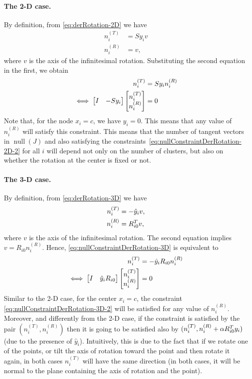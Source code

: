 \documentclass[12pt]{article}
\DeclareMathOperator{\nullspace}{null}
\newcommand{\niT}{n_i^{(T)}}
\newcommand{\niR}{n_i^{(R)}}
\begin{document}
\paragraph{The 2-D case.} By definition, from \eqref{eq:derRotation-2D} we have
\begin{align}
  \label{eq:nullConstraintDerRotation-2D-T}
  \niT&=Sy_iv\\
  \label{eq:nullConstraintDerRotation-2D-R}
  \niR&=v,
\end{align}
where $v$ is the axis of the infinitesimal rotation. Substituting the second equation in the first, we obtain
\begin{align}
    \niT&=Sy_i\niR\\
    \iff \bmat{I & -Sy_i}\bmat{\niT\\\niR}&=0 
    \label{eq:nullConstraintDerRotation-2D-2}
\end{align}
Note that, for the node $x_i=c$, we have $y_i=0$. This means that any value of $\niR$ will satisfy this constraint. This means that the number of tangent vectors in $\nullspace(J)$ and also satisfying the constraints~\eqref{eq:nullConstraintDerRotation-2D-2} for all $i$ will depend not only on the number of clusters, but also on whether the rotation at the center is fixed or not.
\paragraph{The 3-D case.} By definition, from \eqref{eq:derRotation-3D} we have
\begin{align}
  \label{eq:nullConstraintDerRotation-3D-T}
    \niT&=-\hat{y}_i v,\\
  \label{eq:nullConstraintDerRotation-3D-R}
    \niR&=R_{i0}\transpose v,
\end{align}
where $v$ is the axis of the infinitesimal rotation. The second equation implies $v=R_{i0}\niR$. Hence, \eqref{eq:nullConstraintDerRotation-3D} is equivalent to 
\begin{align}
    \niT&=-\hat{y}_i R_{i0}\niR\\
    \iff \bmat{I & \hat{y}_i R_{i0}}\bmat{\niT\\\niR}&=0 
    \label{eq:nullConstraintDerRotation-3D-2}
\end{align}
Similar to the 2-D case, for the center $x_i=c$, the constraint \eqref{eq:nullConstraintDerRotation-3D-2} will be satisfied for any value of $\niR$. Moreover, and differently from the 2-D case, if the constraint is satisfied by the pair $(\niT,\niR)$ then it is going to be satisfied also by $(\niT,\niR+\alpha R_{i0}\transpose y_i)$ (due to the presence of $\hat{y}_i$). Intuitively, this is due to the fact that if we rotate one of the points, or tilt the axis of rotation toward the point and then rotate it again, in both cases $\niT$ will have the same direction (in both cases, it will be normal to the plane containing the axis of rotation and the point).
\end{document}
